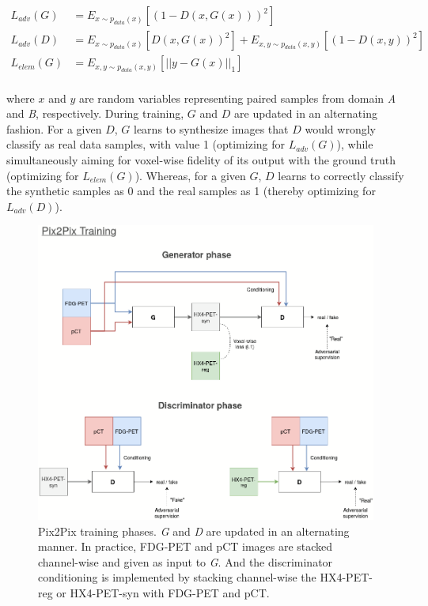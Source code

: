 \begin{equation}
    \begin{aligned}
    L_{adv}(G) &= E_{x \sim p_{data}(x)} [(1 - D(x, G(x)))^2]  \\
    L_{adv}(D) &= E_{x \sim p_{data}(x)} [D(x, G(x))^2] + E_{x,y \sim p_{data}(x,y)} [(1 - D(x,y))^2] \\
    L_{elem}(G) &= E_{x,y \sim p_{data}(x,y)} [|| y - G(x) ||_1]  \\
    \end{aligned}
    \label{eq:pix2pix_loss_expansion}
\end{equation}

where $x$ and $y$ are random variables representing paired samples from domain \textit{A} and \textit{B}, respectively. During training, $G$ and $D$ are updated in an alternating fashion. For a given $D$, $G$ learns to synthesize images that $D$ would wrongly classify as real data samples, with value 1 (optimizing for $L_{adv}(G)$), while simultaneously aiming for voxel-wise fidelity of its output with the ground truth (optimizing for $L_{elem}(G)$). Whereas, for a given $G$, $D$ learns to correctly classify the synthetic samples as 0 and the real samples as 1 (thereby optimizing for $L_{adv}(D)$).

\begin{figure}[h!]
    \centering
    \includegraphics[width=0.9\linewidth]{figures/GANs/Pix2Pix.png}
    \caption{Pix2Pix training phases. \textit{G} and \textit{D} are updated in an alternating manner. In practice, FDG-PET and pCT images are stacked channel-wise and given as input to \textit{G}. And the discriminator conditioning is implemented by stacking channel-wise the HX4-PET-reg or HX4-PET-syn with FDG-PET and pCT.}
    \label{fig:pix2pix}
\end{figure}{}

